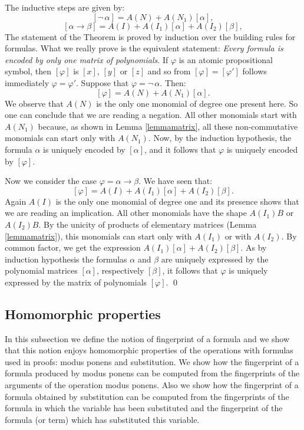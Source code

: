 \documentclass{article}
\theoremstyle{plain}
\theoremstyle{definition}
\begin{document}
The inductive steps are given by:
    $$[\neg \,\alpha] = A( N) + A(N_1) [\alpha],$$
    $$[\alpha \rightarrow \beta] = A(I) + A(I_1) [\alpha] + A(I_2) [\beta], $$
The statement of the Theorem is proved by induction over the building rules for formulas. What we really prove is the equivalent statement: {\it Every formula is encoded by only one matrix of polynomials}.  If $\varphi$ is an atomic propositional symbol, then $[\varphi]$ is $[x]$,  $[y]$ or $[z]$ and so from $[\varphi] = [\varphi']$ follows immediately $\varphi = \varphi'$. Suppose that $\varphi = \neg \, \alpha$. Then:
$$[\varphi] = A(N) + A(N_1) [\alpha].$$
We observe that $A(N)$ is the only one monomial of degree one present here. So one can conclude that we are reading a negation. All other monomials start with $A(N_1)$ because, as shown in Lemma \ref{lemmamatrix}, all these non-commutative monomials can start only with $A(N_1)$. Now, by the induction hypothesis, the formula $\alpha$ is uniquely encoded by $[\alpha]$, and it follows that $\varphi$ is uniquely encoded by $[\varphi]$. 

Now we consider the case $\varphi = \alpha \rightarrow \beta$. We have seen that: 
$$[\varphi] = A(I) + A(I_1) [\alpha] + A(I_2) [\beta].$$
Again $A(I)$ is the only one monomial of degree one and its presence shows that we are reading an implication. All other monomials have the shape $A(I_1) B$ or $A(I_2)B$. By the unicity of products of elementary matrices (Lemma \ref{lemmamatrix}), this monomials can start only with $A(I_1)$ or with $A(I_2)$. By common factor, we get the expression $A(I_1) [\alpha] + A(I_2) [\beta]$. As by induction hypothesis the formulas $\alpha$ and $\beta$ are uniquely expressed by the polynomial matrices $[\alpha]$, respectively $[\beta]$, it follows that $\varphi$ is uniquely expressed by the matrix of polynomials $[\varphi]$. 
\qed

\subsection{Homomorphic properties} 

In this subsection we define the notion of fingerprint of a formula and we show that this notion enjoys homomorphic properties of the operations with formulas used in proofs: modus ponens and substitution. We show how the fingerprint of a formula produced by modus ponens can be computed from the fingerprints of the arguments of the operation modus ponens. Also we show how the fingerprint of a formula obtained by substitution can be computed from the fingerprints of the formula in which the variable has been substituted and the fingerprint of the formula (or term) which has substituted this variable. 
\end{document}
